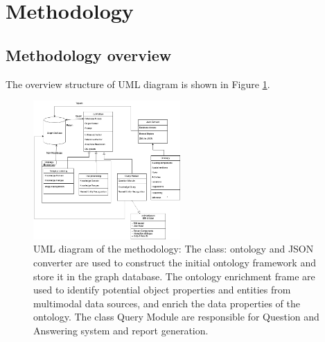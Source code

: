 \section*{Methodology}
\label{sec:methodology}
\subsection*{Methodology overview}
The overview structure of UML diagram is shown in Figure \ref{fig:uml_diagram}.
\begin{figure}[htbp]
    \centering
    \includegraphics[width=0.5\textwidth]{figures/uml.png}
    \caption{UML diagram of the methodology: 
    The class: ontology and JSON converter are used to construct the initial ontology framework and store it in the graph database. 
    The ontology enrichment frame are used to identify potential object properties and entities from multimodal data sources, and enrich the data properties of the ontology. The class Query Module are responsible for Question and Answering system and report generation.}
    \label{fig:uml_diagram}
\end{figure}


